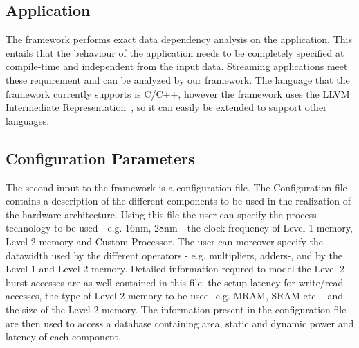 \subsection{Application}
\label{ssec:app}
The framework performs exact data dependency analysis on the application. This entails that the behaviour of the application needs to be completely specified at compile-time and independent from the input data. Streaming applications meet these requirement and can be analyzed by our framework. The language that the framework currently supports is C/C++, however the framework uses the LLVM Intermediate Representation~\cite{llvm}, so it can easily be extended to support other languages.

\subsection{Configuration Parameters}
\label{ssec:conf_param}
The second input to the framework is a configuration file. The Configuration file contains a description of the different components to be used in the realization of the hardware architecture. Using this file the user can specify the process technology to be used - e.g. 16nm, 28nm - the clock frequency of Level 1 memory, Level 2 memory and Custom Processor. The user can moreover specify the datawidth used by the different operators - e.g. multipliers, adders-, and by the Level 1 and Level 2 memory. 
Detailed information requred to model the Level 2 burst accesses are as well contained in this file: the setup latency for write/read accesses, the type of Level 2 memory to be used -e.g. MRAM, SRAM etc..- and the size of the Level 2 memory. The information present in the configuration file are then used to access a database containing area, static and dynamic power and latency of each component.

%

